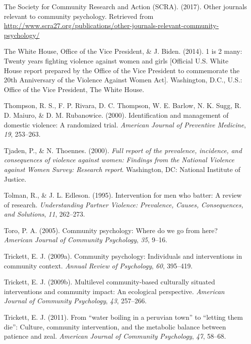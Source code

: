 \documentclass[11pt,]{tufte-book}
\begin{document}
\hypertarget{ref-scra2017other}{}
The Society for Community Research and Action (SCRA). (2017). Other
journals relevant to community psychology. Retrieved from
\url{http://www.scra27.org/publications/other-journals-relevant-community-psychology/}

\hypertarget{ref-biden2014twenty}{}
The White House, Office of the Vice President, \& J. Biden. (2014). 1 is
2 many: Twenty years fighting violence against women and girls
{[}Official U.S. White House report prepared by the Office of the Vice
President to commemorate the 20th Anniversary of the Violence Against
Women Act{]}. Washington, D.C., U.S.: Office of the Vice President, The
White House.

\hypertarget{ref-thompson2000identification}{}
Thompson, R. S., F. P. Rivara, D. C. Thompson, W. E. Barlow, N. K. Sugg,
R. D. Maiuro, \& D. M. Rubanowice. (2000). Identification and management
of domestic violence: A randomized trial. \emph{American Journal of
Preventive Medicine}, \emph{19}, 253--263.

\hypertarget{ref-tjaden2000full}{}
Tjaden, P., \& N. Thoennes. (2000). \emph{Full report of the prevalence,
incidence, and consequences of violence against women: Findings from the
National Violence against Women Survey: Research report}. Washington,
DC: National Institute of Justice.

\hypertarget{ref-tolman1995intervention}{}
Tolman, R., \& J. L. Edleson. (1995). Intervention for men who batter: A
review of research. \emph{Understanding Partner Violence: Prevalence,
Causes, Consequences, and Solutions}, \emph{11}, 262--273.

\hypertarget{ref-toro2005community}{}
Toro, P. A. (2005). Community psychology: Where do we go from here?
\emph{American Journal of Community Psychology}, \emph{35}, 9--16.

\hypertarget{ref-trickett2009community}{}
Trickett, E. J. (2009a). Community psychology: Individuals and
interventions in community context. \emph{Annual Review of Psychology},
\emph{60}, 395--419.

\hypertarget{ref-trickett2009multilevel}{}
Trickett, E. J. (2009b). Multilevel community-based culturally situated
interventions and community impact: An ecological perspective.
\emph{American Journal of Community Psychology}, \emph{43}, 257--266.

\hypertarget{ref-trickett2011water}{}
Trickett, E. J. (2011). From ``water boiling in a peruvian town'' to
``letting them die'': Culture, community intervention, and the metabolic
balance between patience and zeal. \emph{American Journal of Community
Psychology}, \emph{47}, 58--68.
\end{document}
